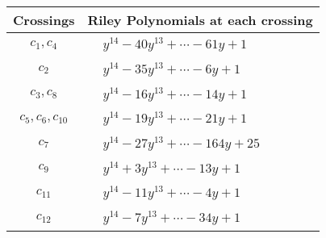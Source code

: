 \documentclass[1p]{elsarticle_modified}
\theoremstyle{definition}
\begin{document}
\begin{tabular}{m{50pt}|m{274pt}}
Crossings & \hspace{64pt}Riley Polynomials at each crossing \\
\hline $$\begin{aligned}c_{1},c_{4}\end{aligned}$$&$\begin{aligned}
&y^{14}-40 y^{13}+\cdots-61 y+1
\end{aligned}$\\
\hline $$\begin{aligned}c_{2}\end{aligned}$$&$\begin{aligned}
&y^{14}-35 y^{13}+\cdots-6 y+1
\end{aligned}$\\
\hline $$\begin{aligned}c_{3},c_{8}\end{aligned}$$&$\begin{aligned}
&y^{14}-16 y^{13}+\cdots-14 y+1
\end{aligned}$\\
\hline $$\begin{aligned}c_{5},c_{6},c_{10}\end{aligned}$$&$\begin{aligned}
&y^{14}-19 y^{13}+\cdots-21 y+1
\end{aligned}$\\
\hline $$\begin{aligned}c_{7}\end{aligned}$$&$\begin{aligned}
&y^{14}-27 y^{13}+\cdots-164 y+25
\end{aligned}$\\
\hline $$\begin{aligned}c_{9}\end{aligned}$$&$\begin{aligned}
&y^{14}+3 y^{13}+\cdots-13 y+1
\end{aligned}$\\
\hline $$\begin{aligned}c_{11}\end{aligned}$$&$\begin{aligned}
&y^{14}-11 y^{13}+\cdots-4 y+1
\end{aligned}$\\
\hline $$\begin{aligned}c_{12}\end{aligned}$$&$\begin{aligned}
&y^{14}-7 y^{13}+\cdots-34 y+1
\end{aligned}$\\
\hline
\end{tabular}\\~\\
\end{document}
